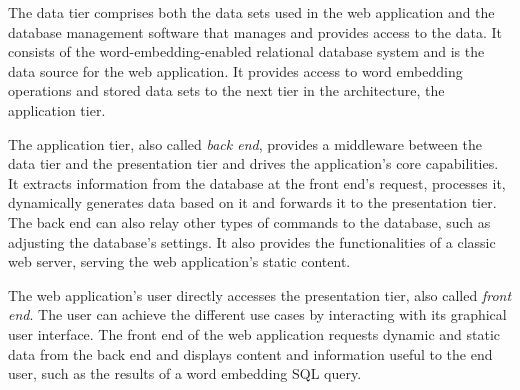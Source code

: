 The data tier comprises both the data sets used in the web application and the database management software that manages and provides access to the data. It consists of the word-embedding-enabled relational database system and is the data source for the web application. It provides access to word embedding operations and stored data sets to the next tier in the architecture, the application tier.

The application tier, also called \textit{back end}, provides a middleware between the data tier and the presentation tier and drives the application's core capabilities. It extracts information from the database at the front end's request, processes it, dynamically generates data based on it and forwards it to the presentation tier. The back end can also relay other types of commands to the database, such as adjusting the database's settings. It also provides the functionalities of a classic web server, serving the web application's static content.

The web application's user directly accesses the presentation tier, also called \textit{front end}. The user can achieve the different use cases by interacting with its graphical user interface. The front end of the web application requests dynamic and static data from the back end and displays content and information useful to the end user, such as the results of a word embedding SQL query.

